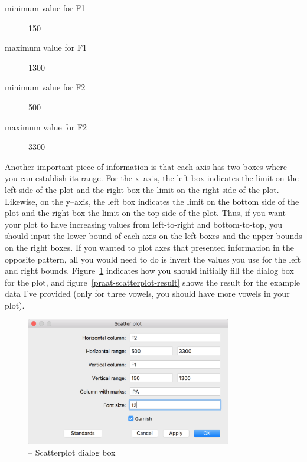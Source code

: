 \begin{description}
\item[minimum value for F1] 150
\item[maximum value for F1] 1300
\item[minimum value for F2] 500
\item[maximum value for F2] 3300
\end{description}




Another important piece of information is that each axis has two boxes where you can establish its range. For the x--axis, the left box indicates the limit on the left side of the plot and the right box the limit on the right side of the plot. Likewise, on the y--axis, the left box indicates the limit on the bottom side of the plot and the right box the limit on the top side of the plot. Thus, if you want your plot to have increasing values from left-to-right and bottom-to-top, you should input the lower bound of each axis on the left boxes and the upper bounds on the right boxes. If you wanted to plot axes that presented information in the opposite pattern, all you would need to do is invert the values you use for the left and right bounds. Figure~\ref{praat-scatterplot-dialog} indicates how you should initially fill the dialog box for the plot, and figure~\ref{praat-scatterplot-result} shows the result for the example data I've provided (only for three vowels, you should have more vowels in your plot).

\begin{figure}[!tbp]
\caption{\Praat{} -- Scatterplot dialog box}
\label{praat-scatterplot-dialog}
	\begin{center}
		\includegraphics[width=0.8\textwidth]{./figures/Praat-15-Scatterplot-02}
	\end{center}
\end{figure}


